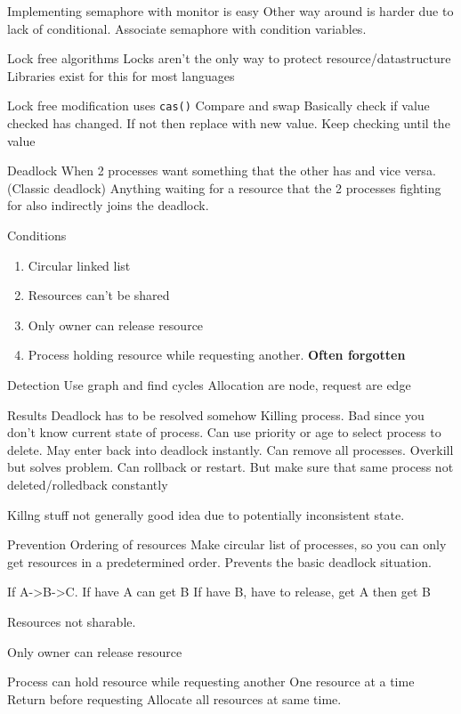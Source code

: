 \documentclass{article}
\begin{document}
		Implementing semaphore with monitor is easy
		Other way around is harder due to lack of conditional.
			Associate semaphore with condition variables.

	Lock free algorithms
		Locks aren't the only way to protect resource/datastructure
		Libraries exist for this for most languages

	Lock free modification
		uses \texttt{cas()} Compare and swap
		Basically check if value checked has changed. If not then replace with new value.
		Keep checking until the value
		
	Deadlock
		When 2 processes want something that the other has and vice versa. (Classic deadlock)
		Anything waiting for a resource that the 2 processes fighting for also indirectly joins the deadlock.

		Conditions
		\begin{enumerate}
			\item 	Circular linked list
			\item Resources can't be shared
			\item Only owner can release resource
			\item Process holding resource while requesting another. \textbf{Often forgotten}
		\end{enumerate}
			
		Detection
			Use graph and find cycles
			Allocation are node, request are edge

		Results
			Deadlock has to be resolved somehow
				Killing process. Bad since you don't know current state of process.
				Can use priority or age to select process to delete.
			May enter back into deadlock instantly.
				Can remove all processes. Overkill but solves problem.
			Can rollback or restart. But make sure that same process not deleted/rolledback constantly


			Killng stuff not generally good idea due to potentially inconsistent state.

		Prevention
			Ordering of resources
				Make circular list of processes, so you can only get resources in a predetermined order. Prevents the basic deadlock situation.

				If A->B->C.
				If have A can get B
				If have B, have to release, get A then get B

			Resources not sharable.

			Only owner can release resource

			Process can hold resource while requesting another
				One resource at a time
				Return before requesting
				Allocate all resources at same time.
\end{document}
